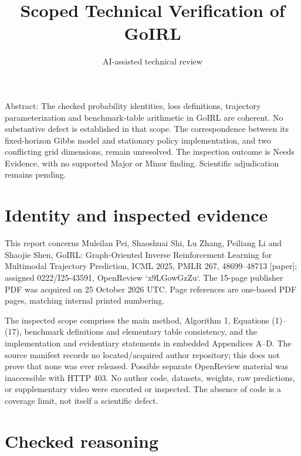 \documentclass[10pt]{article}
\title{Scoped Technical Verification of GoIRL}
\author{AI-assisted technical review}
\date{}
\begin{document}
\maketitle
Abstract: The checked probability identities, loss definitions, trajectory parameterization and benchmark-table arithmetic in GoIRL are coherent. No substantive defect is established in that scope. The correspondence between its fixed-horizon Gibbs model and stationary policy implementation, and two conflicting grid dimensions, remain unresolved. The inspection outcome is Needs Evidence, with no supported Major or Minor finding. Scientific adjudication remains pending.\par
\section*{Identity and inspected evidence}
This report concerns Muleilan Pei, Shaoshuai Shi, Lu Zhang, Peiliang Li and Shaojie Shen, GoIRL: Graph-Oriented Inverse Reinforcement Learning for Multimodal Trajectory Prediction, ICML 2025, PMLR 267, 48699–48713 [paper]; assigned 0222/I25-43591, OpenReview `x9LGowGzZu`. The 15-page publisher PDF was acquired on 25 October 2026 UTC. Page references are one-based PDF pages, matching internal printed numbering.\par
The inspected scope comprises the main method, Algorithm 1, Equations (1)–(17), benchmark definitions and elementary table consistency, and the implementation and evidentiary statements in embedded Appendices A–D. The source manifest records no located/acquired author repository; this does not prove that none was ever released. Possible separate OpenReview material was inaccessible with HTTP 403. No author code, datasets, weights, raw predictions, or supplementary video were executed or inspected. The absence of code is a coverage limit, not itself a scientific defect.\par
\section*{Checked reasoning}
\end{document}
